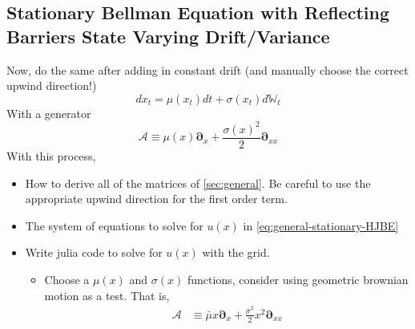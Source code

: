 \documentclass[11pt]{article}
\newcommand{\D}[1][]{\ensuremath{\boldsymbol{\partial}_{#1}}}
\newcommand{\W}{\ensuremath{\mathbb{W}}}
\newcommand{\A}{\ensuremath{\mathcal{A}}}
\begin{document}
\subsection{Stationary Bellman Equation with Reflecting Barriers State Varying Drift/Variance}
Now, do the same after adding in constant drift (and manually choose the correct upwind direction!)
$$
d x_t = \mu(x_t) dt + \sigma(x_t) d\W_t
$$
With a generator
$$
\A \equiv \mu(x) \D[x] + \frac{\sigma(x)^2}{2}\D[xx]
$$
With this process,
\begin{itemize}
	\item How to derive all of the matrices of \cref{sec:general}.  Be careful to use the appropriate upwind direction for the first order term.
	\item The system of equations to solve for $u(x)$ in \cref{eq:general-stationary-HJBE}
	\item Write julia code to solve for $u(x)$ with the grid.
	\begin{itemize}
		\item Choose a $\mu(x)$ and $\sigma(x)$ functions, consider using geometric brownian motion as a test.  That is,
		\begin{align}
			\A &\equiv \bar{\mu} x \D[x] + \frac{\bar{\sigma}^2}{2}x^2\D[xx]
		\end{align}
	\end{itemize}
\end{itemize}
\end{document}
